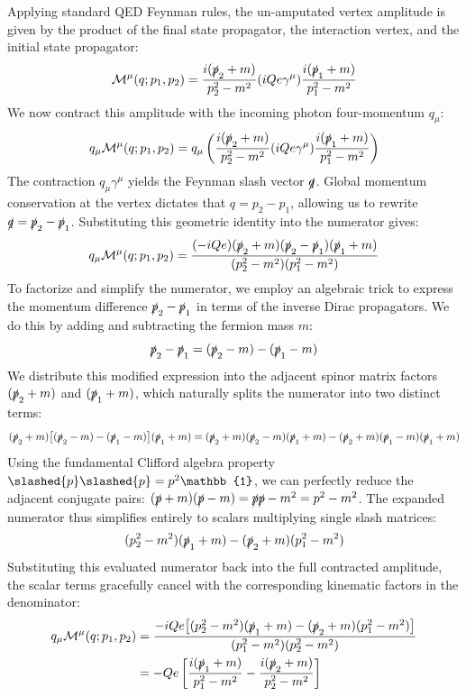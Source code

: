 
Applying standard QED Feynman rules, the un-amputated vertex amplitude is given by the product of the final state propagator, the interaction vertex, and the initial state propagator:
\[
    \mathcal{M}^\mu(q; p_1, p_2) = \frac{i(\slashed{p}_2 + m)}{p_2^2 - m^2} (iQe\gamma^\mu) \frac{i(\slashed{p}_1 + m)}{p_1^2 - m^2}
\]
We now contract this amplitude with the incoming photon four-momentum $q_\mu$:
\[
    q_\mu \mathcal{M}^\mu(q; p_1, p_2) = q_\mu \left( \frac{i(\slashed{p}_2 + m)}{p_2^2 - m^2} (iQe\gamma^\mu) \frac{i(\slashed{p}_1 + m)}{p_1^2 - m^2} \right)
\]
The contraction $q_\mu \gamma^\mu$ yields the Feynman slash vector $\slashed{q}$. Global momentum conservation at the vertex dictates that $q = p_2 - p_1$, allowing us to rewrite $\slashed{q} = \slashed{p}_2 - \slashed{p}_1$. Substituting this geometric identity into the numerator gives:
\[
    q_\mu \mathcal{M}^\mu(q; p_1, p_2) = \frac{(-iQe) (\slashed{p}_2 + m)(\slashed{p}_2 - \slashed{p}_1)(\slashed{p}_1 + m)}{(p_2^2 - m^2)(p_1^2 - m^2)}
\]
To factorize and simplify the numerator, we employ an algebraic trick to express the momentum difference $\slashed{p}_2 - \slashed{p}_1$ in terms of the inverse Dirac propagators. We do this by adding and subtracting the fermion mass $m$:
\[
    \slashed{p}_2 - \slashed{p}_1 = (\slashed{p}_2 - m) - (\slashed{p}_1 - m)
\]
We distribute this modified expression into the adjacent spinor matrix factors $(\slashed{p}_2 + m)$ and $(\slashed{p}_1 + m)$, which naturally splits the numerator into two distinct terms:
\[
    (\slashed{p}_2 + m) \big[ (\slashed{p}_2 - m) - (\slashed{p}_1 - m) \big] (\slashed{p}_1 + m) = (\slashed{p}_2 + m)(\slashed{p}_2 - m)(\slashed{p}_1 + m) - (\slashed{p}_2 + m)(\slashed{p}_1 - m)(\slashed{p}_1 + m)
\]
Using the fundamental Clifford algebra property $\slashed{p}\slashed{p} = p^2 \mathbb{1}$, we can perfectly reduce the adjacent conjugate pairs: $(\slashed{p} + m)(\slashed{p} - m) = \slashed{p}\slashed{p} - m^2 = p^2 - m^2$. The expanded numerator thus simplifies entirely to scalars multiplying single slash matrices:
\[
    (p_2^2 - m^2)(\slashed{p}_1 + m) - (\slashed{p}_2 + m)(p_1^2 - m^2)
\]
Substituting this evaluated numerator back into the full contracted amplitude, the scalar terms gracefully cancel with the corresponding kinematic factors in the denominator:
\[
    \begin{aligned}
        q_\mu \mathcal{M}^\mu(q; p_1, p_2) & = \frac{-iQe \big[ (p_2^2 - m^2)(\slashed{p}_1 + m) - (\slashed{p}_2 + m)(p_1^2 - m^2) \big]}{(p_1^2 - m^2)(p_2^2 - m^2)} \\
                                           & = -Qe \left[ \frac{i(\slashed{p}_1 + m)}{p_1^2 - m^2} - \frac{i(\slashed{p}_2 + m)}{p_2^2 - m^2} \right]
    \end{aligned}
\]

